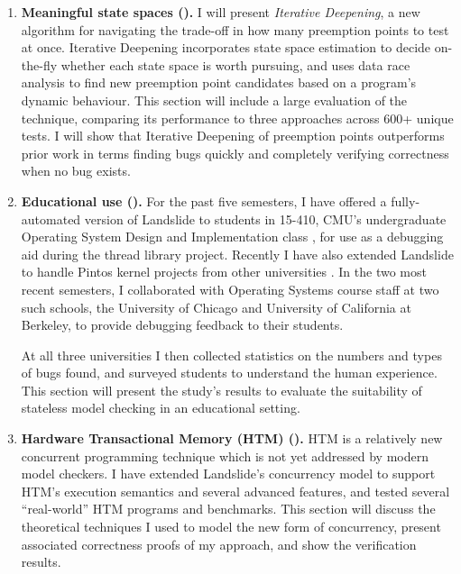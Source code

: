 \begin{enumerate}
	\item {\bf Meaningful state spaces ().}
		I will present {\em Iterative Deepening}, a new algorithm for navigating the trade-off in how many preemption points to test at once.
		Iterative Deepening incorporates state space estimation \cite{estimation} to decide on-the-fly whether each state space is worth pursuing, and uses data race analysis \cite{tsan} to find new preemption point candidates based on a program's dynamic behaviour.
		This section will include a large evaluation of the technique, comparing its performance to three  approaches across 600+ unique tests.
		I will show that Iterative Deepening of preemption points outperforms prior work in terms  finding bugs quickly and completely verifying correctness when no bug exists.
	\item {\bf Educational use ().}
		For the past five semesters, I have offered a fully-automated version of Landslide to students in 15-410, CMU's undergraduate Operating System Design and Implementation class \cite{kspec,thrlib}, for use as a debugging aid during the thread library project.
		Recently I have also extended Landslide to handle Pintos kernel projects from other universities \cite{pintos}.
		In the two most recent semesters, I collaborated with Operating Systems course staff at two such schools, the University of Chicago and University of California at Berkeley,
		to provide debugging feedback to their students.

		At all three universities I then collected statistics on the numbers and types of bugs found,
		and surveyed students to understand the human experience.
		This section will present the study's results
		to evaluate the suitability of stateless model checking in an educational setting.
	\item {\bf Hardware Transactional Memory (HTM) ().}
		HTM is a relatively new concurrent programming technique \cite{htm-haswell,htm-experience}
		which is not yet addressed by modern model checkers.
		I have extended Landslide's concurrency model to support
		HTM's execution semantics and several advanced features, %
		and tested several ``real-world'' HTM programs and benchmarks.
		This section will discuss the theoretical techniques I used to model the new form of concurrency,
		present associated correctness proofs of my approach,
		and show the verification results.
\end{enumerate}

